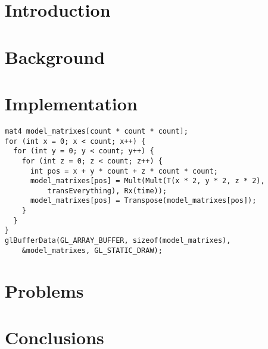 \documentclass[a4paper,12pt]{article}
\begin{document}
\section{Introduction}


\section{Background}


\section{Implementation}

\begin{lstlisting}
mat4 model_matrixes[count * count * count];
for (int x = 0; x < count; x++) {
  for (int y = 0; y < count; y++) {
    for (int z = 0; z < count; z++) {
      int pos = x + y * count + z * count * count;
      model_matrixes[pos] = Mult(Mult(T(x * 2, y * 2, z * 2),
          transEverything), Rx(time));
      model_matrixes[pos] = Transpose(model_matrixes[pos]);
    }
  }
}
glBufferData(GL_ARRAY_BUFFER, sizeof(model_matrixes),
    &model_matrixes, GL_STATIC_DRAW);
\end{lstlisting}


\section{Problems}


\section{Conclusions}
\end{document}
